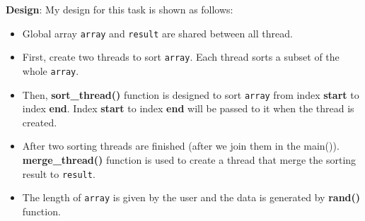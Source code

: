 \documentclass[UTF8,10pt,a4paper]{article}
\theoremstyle{Problem}
\theoremstyle{Solution}
\begin{document}
\textbf{Design}: My design for this task is shown as follows:
\begin{itemize}
    \item Global array \texttt{array} and \texttt{result} are shared between all thread.
    \item First, create two threads to sort \texttt{array}. Each thread sorts a subset of the whole \texttt{array}.
    \item Then, \textbf{sort\_thread()} function is designed to sort \texttt{array} from index \textbf{start} to index \textbf{end}. Index \textbf{start} to index \textbf{end} will be passed to it when the thread is created.
    \item After two sorting threads are finished (after we join them in the main()). \textbf{merge\_thread()} function is used to create a thread that merge the sorting result to \texttt{result}.
    \item The length of \texttt{array} is given by the user and the data is generated by \textbf{rand()} function.
\end{itemize}
\end{document}
